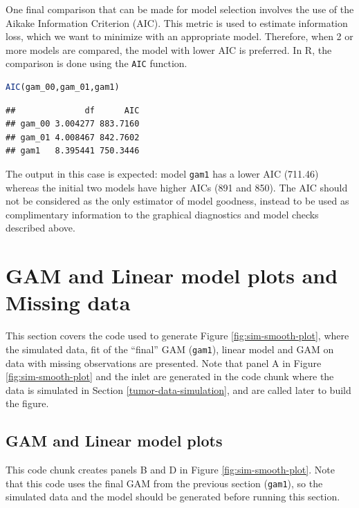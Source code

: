 \documentclass[
]{article}
\newcommand{\passthrough}[1]{#1}
\begin{document}
One final comparison that can be made for model selection involves the use of the Aikake Information Criterion (AIC). This metric is used to estimate information loss, which we want to minimize with an appropriate model. Therefore, when 2 or more models are compared, the model with lower AIC is preferred. In R, the comparison is done using the \passthrough{\lstinline!AIC!} function.

\begin{lstlisting}[language=R]
AIC(gam_00,gam_01,gam1)
\end{lstlisting}

\begin{lstlisting}
##              df      AIC
## gam_00 3.004277 883.7160
## gam_01 4.008467 842.7602
## gam1   8.395441 750.3446
\end{lstlisting}

The output in this case is expected: model \passthrough{\lstinline!gam1!} has a lower AIC (711.46) whereas the initial two models have higher AICs (891 and 850). The AIC should not be considered as the only estimator of model goodness, instead to be used as complimentary information to the graphical diagnostics and model checks described above.

\hypertarget{gam-and-linear-model-plots-and-missing-data}{%
\section{GAM and Linear model plots and Missing data}\label{gam-and-linear-model-plots-and-missing-data}}

This section covers the code used to generate Figure \ref{fig:sim-smooth-plot}, where the simulated data, fit of the ``final'' GAM (\passthrough{\lstinline!gam1!}), linear model and GAM on data with missing observations are presented. Note that panel A in Figure \ref{fig:sim-smooth-plot} and the inlet are generated in the code chunk where the data is simulated in Section \ref{tumor-data-simulation}, and are called later to build the figure.

\hypertarget{gam-and-linear-model-plots}{%
\subsection{GAM and Linear model plots}\label{gam-and-linear-model-plots}}

This code chunk creates panels B and D in Figure \ref{fig:sim-smooth-plot}. Note that this code uses the final GAM from the previous section (\passthrough{\lstinline!gam1!}), so the simulated data and the model should be generated before running this section.
\end{document}
